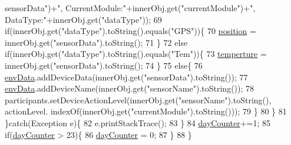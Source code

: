 \begin{DoxyCode}
{      sensorData"})+\textcolor{stringliteral}{", CurrentModule:"}+innerObj.get(\textcolor{stringliteral}{"currentModule"})+\textcolor{stringliteral}{", DataType:"}+innerObj.get(\textcolor{stringliteral}{"dataType"}));
69                 \textcolor{keywordflow}{if}(innerObj.get(\textcolor{stringliteral}{"dataType"}).toString().equals(\textcolor{stringliteral}{"GPS"}))\{
70                     \mbox{\hyperlink{classcom_1_1github_1_1aites_1_1shlocalaites_1_1monitor_1_1_data_pre_processor_a47fa72faec38e305008aac9ef4b46933}{position}} = innerObj.get(\textcolor{stringliteral}{"sensorData"}).toString();
71                 \}
72                 \textcolor{keywordflow}{else} \textcolor{keywordflow}{if}(innerObj.get(\textcolor{stringliteral}{"dataType"}).toString().equals(\textcolor{stringliteral}{"Tem"}))\{
73                     \mbox{\hyperlink{classcom_1_1github_1_1aites_1_1shlocalaites_1_1monitor_1_1_data_pre_processor_a130f82de42bf7738d4aef7fa8390fee8}{temperture}} = innerObj.get(\textcolor{stringliteral}{"sensorData"}).toString();
74                 \}
75                 \textcolor{keywordflow}{else}\{
76                     \mbox{\hyperlink{classcom_1_1github_1_1aites_1_1shlocalaites_1_1monitor_1_1_data_pre_processor_af8a0c4f55f04ec09d3c67c3a37de6bcc}{envData}}.addDeviceData(innerObj.get(\textcolor{stringliteral}{"sensorData"}).toString());
77                     \mbox{\hyperlink{classcom_1_1github_1_1aites_1_1shlocalaites_1_1monitor_1_1_data_pre_processor_af8a0c4f55f04ec09d3c67c3a37de6bcc}{envData}}.addDeviceName(innerObj.get(\textcolor{stringliteral}{"sensorName"}).toString());
78                     participants.setDeviceActionLevel(innerObj.get(\textcolor{stringliteral}{"sensorName"}).toString(), actionLevel.
      indexOf(innerObj.get(\textcolor{stringliteral}{"currentModule"}).toString()));
79                 \}
80             \}
81         \}\textcolor{keywordflow}{catch}(Exception e)\{
82             e.printStackTrace();
83         \}
84         \mbox{\hyperlink{classcom_1_1github_1_1aites_1_1shlocalaites_1_1monitor_1_1_data_pre_processor_a0c0990b68908b9c96b2a832d33fd3ac4}{dayCounter}}+=1;
85         \textcolor{keywordflow}{if}(\mbox{\hyperlink{classcom_1_1github_1_1aites_1_1shlocalaites_1_1monitor_1_1_data_pre_processor_a0c0990b68908b9c96b2a832d33fd3ac4}{dayCounter}} > 23)\{
86             \mbox{\hyperlink{classcom_1_1github_1_1aites_1_1shlocalaites_1_1monitor_1_1_data_pre_processor_a0c0990b68908b9c96b2a832d33fd3ac4}{dayCounter}} = 0;
87         \}
88     \}
\end{DoxyCode}


